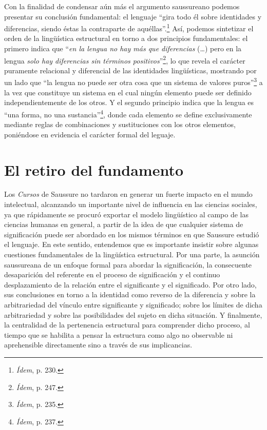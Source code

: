 Con la finalidad de condensar aún más el argumento saussureano podemos
presentar su conclusión fundamental: el lenguaje \enquote{gira todo él sobre
identidades y diferencias, siendo éstas la contraparte de
aquéllas}.\footnote{\emph{Ídem}, p. 230.} Así, podemos sintetizar el
orden de la lingüística estructural en torno a dos principios
fundamentales: el primero indica que \enquote{\emph{en la lengua no hay más que
diferencias} (\dots) pero en la lengua \emph{solo hay diferencias
sin términos positivos}}\footnote{\emph{Ídem}, p. 247.}, lo que revela
el carácter puramente relacional y diferencial de las identidades
lingüísticas, mostrando por un lado que \enquote{la lengua no puede ser otra
cosa que un sistema de valores puros}\footnote{\emph{Ídem}, p. 235.} a
la vez que constituye un sistema en el cual ningún elemento puede ser
definido independientemente de los otros. Y el segundo principio indica
que la lengua es \enquote{una forma, no una sustancia}\footnote{\emph{Ídem}, p.
  237.}, donde cada elemento se define exclusivamente mediante reglas de
combinaciones y sustituciones con los otros elementos, poniéndose en
evidencia el carácter formal del leguaje.

\hypertarget{el-retiro-del-fundamento}{%
\section{El retiro del fundamento}\label{el-retiro-del-fundamento}}

Los \emph{Cursos} de Saussure no tardaron en generar un fuerte impacto
en el mundo intelectual, alcanzando un importante nivel de influencia en
las ciencias sociales, ya que rápidamente se procuró exportar el modelo
lingüístico al campo de las ciencias humanas en general, a partir de la
idea de que cualquier sistema de significación puede ser abordado en los
mismos términos en que Saussure estudió el lenguaje. En este sentido,
entendemos que es importante insistir sobre algunas cuestiones
fundamentales de la lingüística estructural. Por una parte, la asunción
saussureana de un enfoque formal para abordar la significación, la
consecuente desaparición del referente en el proceso de significación y
el continuo desplazamiento de la relación entre el significante y el
significado. Por otro lado, sus conclusiones en torno a la identidad
como reverso de la diferencia y sobre la arbitrariedad del vínculo entre
significante y significado; sobre los límites de dicha arbitrariedad y
sobre las posibilidades del sujeto en dicha situación. Y finalmente, la
centralidad de la pertenencia estructural para comprender dicho proceso,
al tiempo que se habilita a pensar la estructura como algo no observable
ni aprehensible directamente sino a través de sus implicancias.


